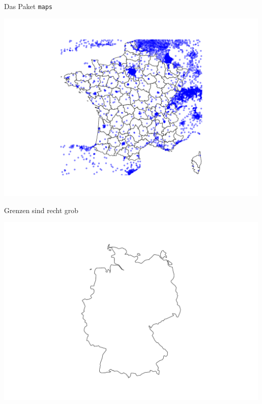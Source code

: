 \begin{frame}[fragile]{Das Paket \texttt{maps}}

\begin{Shaded}
\begin{Highlighting}[]
\NormalTok{(}\NormalTok{)}
\NormalTok{)}
\end{Highlighting}
\end{Shaded}

\includegraphics{ps_user_stuttgart_part3_files/figure-beamer/unnamed-chunk-5-1.pdf}

\end{frame}

\begin{frame}[fragile]{Grenzen sind recht grob}

\begin{Shaded}
\begin{Highlighting}[]
\NormalTok{(}\NormalTok{, }\NormalTok{)}
\end{Highlighting}
\end{Shaded}

\includegraphics{ps_user_stuttgart_part3_files/figure-beamer/unnamed-chunk-6-1.pdf}

\end{frame}


